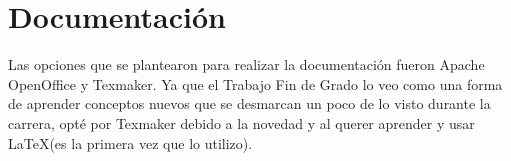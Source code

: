 \section{Documentación}\label{documentacion}
Las opciones que se plantearon para realizar la documentación fueron Apache OpenOffice y Texmaker. Ya que el Trabajo Fin de Grado lo veo como una forma de aprender conceptos nuevos que se desmarcan un poco de lo visto durante la carrera, opté por Texmaker debido a la novedad y al querer aprender y usar \LaTeX (es la primera vez que lo utilizo).
